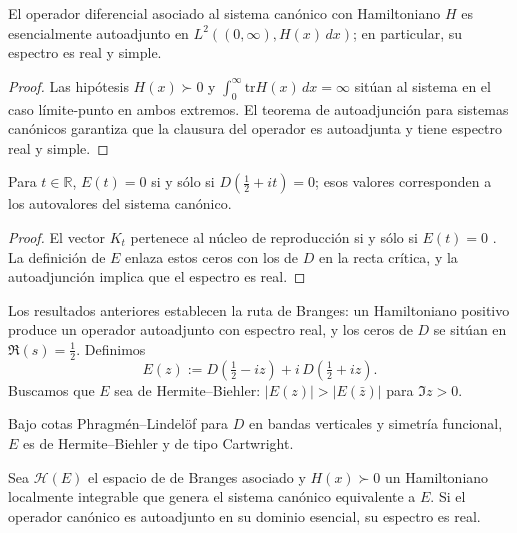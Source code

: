 \begin{proposition}[Autoadjunción]\label{prop:paper-selfadjoint}
El operador diferencial asociado al sistema canónico con Hamiltoniano $H$ es
esencialmente autoadjunto en $L^2((0,\infty),H(x)\,dx)$; en particular, su
espectro es real y simple.
\end{proposition}

\begin{proof}
Las hipótesis $H(x)\succ0$ y
$\int_0^{\infty}\mathrm{tr}H(x)\,dx=\infty$ sitúan al sistema en el caso
límite-punto en ambos extremos.  El teorema de autoadjunción para sistemas
canónicos \cite[Thm.~35]{deBranges1986} garantiza que la clausura del operador es
autoadjunta y tiene espectro real y simple.
\end{proof}

\begin{proposition}\label{prop:paper-spectrum}
Para $t\in\mathbb{R}$, $E(t)=0$ si y sólo si $D\!\left(\tfrac{1}{2}+it\right)=0$; esos
valores corresponden a los autovalores del sistema canónico.
\end{proposition}

\begin{proof}
El vector $K_t$ pertenece al núcleo de reproducción si y sólo si $E(t)=0$
\cite[Thm.~22]{deBranges1986}.  La definición de $E$ enlaza estos ceros con los
de $D$ en la recta crítica, y la autoadjunción implica que el espectro es real.
\end{proof}

Los resultados anteriores establecen la ruta de Branges: un Hamiltoniano positivo
produce un operador autoadjunto con espectro real, y los ceros de $D$ se sitúan en
$\Re(s)=\tfrac{1}{2}$.
Definimos
\[
E(z):=D\!\left(\tfrac{1}{2}-iz\right)+i\,D\!\left(\tfrac{1}{2}+iz\right).
\]
Buscamos que $E$ sea de Hermite--Biehler: $|E(z)|>|E(\bar z)|$ para $\Im z>0$.

\begin{lemma}
Bajo cotas Phragmén--Lindelöf para $D$ en bandas verticales y simetría funcional,
$E$ es de Hermite--Biehler y de tipo Cartwright.
\end{lemma}

\begin{theorem}
Sea $\mathcal{H}(E)$ el espacio de de Branges asociado y $H(x)\succ 0$ un Hamiltoniano
localmente integrable que genera el sistema canónico equivalente a $E$.
Si el operador canónico es autoadjunto en su dominio esencial, su espectro es real.
\end{theorem}

